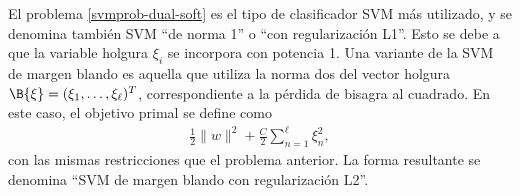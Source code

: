 El problema \ref{svmprob-dual-soft} es el tipo de clasificador SVM más utilizado,
y se denomina también SVM ``de norma 1'' o ``con regularización L1''. Esto
se debe a que la variable holgura $\xi_i$ se incorpora con potencia 1.
Una variante de la SVM de margen blando es aquella que utiliza la norma dos del
vector holgura $\B{\xi}=(\xi_1,\ldots,\xi_\ell)^T$, correspondiente
a la pérdida de bisagra al cuadrado. En este caso, el objetivo primal
se define como
%
\begin{align}
  \label{svm-l2}
  \frac{1}{2}\|w\|^2+\frac{C}{2}\sum_{n=1}^{\ell}\xi_n^2,
\end{align}
%
con las mismas restricciones que el problema anterior.
La forma resultante se denomina ``SVM de margen blando con regularización L2''.
